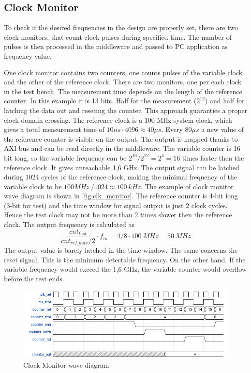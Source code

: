 \subsection{Clock Monitor}
To check if the desired frequencies in the design are properly set, there are two clock monitors, that count clock pulses during specified time. The number of pulses is then processed in the middleware and passed to PC application as frequency value. 

One clock monitor contains two counters, one counts pulses of the variable clock and the other of the reference clock. There are two monitors, one per each clock in the test bench. The measurement time depends on the length of the reference counter. In this example it is 13 bits. Half for the measurement ($2^{12}$) and half for latching the data out and reseting the counter. This approach guaranties a proper clock domain crossing. The reference clock is a 100 MHz system clock, which gives a total measurement time of $10ns \cdot 4096 \approx 40 \mu s$. Every $80 \mu s$ a new value of the reference counter is visible on the output. The output is mapped thanks to AXI bus and can be read directly in the middleware. The variable counter is 16 bit long, so the variable frequency can be $2^{16}/2^{12} = 2^4 = 16$ times faster then the reference clock. It gives unreachable 1,6 GHz. The output signal can be latched during 1024 cycles of the reference clock, making the minimal frequency of the variable clock to be $100MHz\ / 1024 \approx 100 \ kHz$. The example of clock monitor wave diagram is shown in \autoref{fig:clk_monitor}. The reference counter is 4-bit long (3-bit for test) and the time window for signal output is just 2 clock cycles. Hence the test clock may not be more than 2 times slower then the reference clock. The output frequency is calculated as 
\begin{equation}
    \frac{cnt_{test}}{cnt_{ref\_max}/2}\cdot f_{in} = 4/8 \cdot 100 \ MHz = 50\ MHz
\end{equation}
The output value is barely latched in the time window. The same concerns the reset signal. This is the minimum detectable frequency. On the other hand, If the variable frequency would exceed the 1,6 GHz, the variable counter would overflow before the test ends.

\begin{figure}[h]
\centering
\includegraphics[width=\textwidth]{figures/clk_monitor.png}
\caption{Clock Monitor wave diagram}
\label{fig:clk_monitor}
\end{figure}

